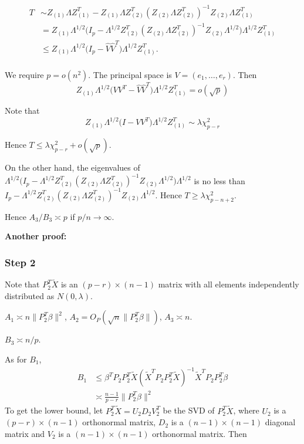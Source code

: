 \documentclass[review]{elsarticle}
\theoremstyle{plain}
\theoremstyle{definition}
\theoremstyle{remark}
\begin{document}
\begin{equation}
    \begin{aligned}
        T&\sim Z_{(1)}\Lambda Z_{(1)}^T-Z_{(1)}\Lambda Z_{(2)}^T{(Z_{(2)}\Lambda Z_{(2)}^T)}^{-1}Z_{(2)}\Lambda Z_{(1)}^T\\
        &=Z_{(1)}\Lambda^{1/2}\big(I_p -\Lambda^{1/2} Z_{(2)}^T{(Z_{(2)}\Lambda Z_{(2)}^T)}^{-1}Z_{(2)}\Lambda^{1/2} \big)\Lambda^{1/2}Z_{(1)}^T\\
        &\leq Z_{(1)}\Lambda^{1/2}\big(I_p -\hat{V}\hat{V}^T\big)\Lambda^{1/2}Z_{(1)}^T.\\
    \end{aligned}
\end{equation}

We require $p=o(n^2)$. The principal space is $V=(e_1,\ldots, e_r)$. Then 
\begin{equation}
    Z_{(1)}\Lambda^{1/2}\big(VV^T -\hat{V}\hat{V}^T\big)\Lambda^{1/2}Z_{(1)}^T=o(\sqrt{p})
\end{equation}

Note that
\begin{equation}
    Z_{(1)}\Lambda^{1/2}\big (I-VV^T) \Lambda^{1/2}Z_{(1)}^T\sim\lambda \chi^2_{p-r}
\end{equation}

Hence $T\leq \lambda\chi^2_{p-r}+o(\sqrt{p})$.

On the other hand, the eigenvalues of $\Lambda^{1/2}\big(I_p -\Lambda^{1/2} Z_{(2)}^T{(Z_{(2)}\Lambda Z_{(2)}^T)}^{-1}Z_{(2)}\Lambda^{1/2} \big)\Lambda^{1/2}$ is no less than $I_p -\Lambda^{1/2} Z_{(2)}^T{(Z_{(2)}\Lambda Z_{(2)}^T)}^{-1}Z_{(2)}\Lambda^{1/2}$. Hence $T\geq \lambda \chi^2_{p-n+2}$.

Hence $A_3/B_3\asymp p$ if $p/n\to \infty$.


\textbf{Another proof:}
\subsubsection{Step 2}

Note that $P_2^T \tilde{X}$ is an $(p-r)\times (n-1)$ matrix with all elements independently distributed as $N(0,\lambda)$.

    $A_1\asymp n\|P_2^T\beta\|^2$, $A_2=O_P(\sqrt{n}\|P_2^T \beta\|)$, $A_3\asymp n$.

    $B_3\asymp n/p$.

    As for $B_1$, 
\begin{equation}
    \begin{aligned}
        B_1&\leq \beta^T P_2 P_2^T \tilde{X} {(\tilde{X}^T P_2 P_2^T \tilde{X})}^{-1}\tilde{X}^T P_2 P_2^T \beta\\
        &\asymp \frac{n-1}{p-r}\|P_2^T\beta\|^2
    \end{aligned}
\end{equation}
To get the lower bound, let $P_2^T \tilde{X}=U_2 D_2 V_2^T$ be the SVD of $P_2^T \tilde{X}$, where $U_2$ is a $(p-r)\times (n-1)$ orthonormal matrix, $D_2$ is a $(n-1)\times(n-1)$ diagonal matrix and $V_2$ is a $(n-1)\times (n-1)$ orthonormal matrix. Then
\end{document}
